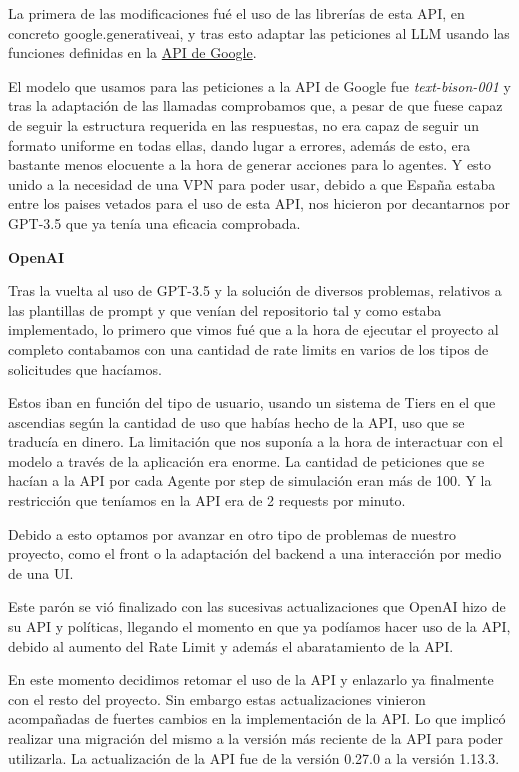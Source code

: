 La primera de las modificaciones fué el uso de las librerías de esta API, en concreto google.generativeai, y tras esto adaptar las peticiones al LLM usando las funciones definidas en la \href{https://ai.google.dev/palm_docs}{API de Google}.

El modelo que usamos para las peticiones a la API de Google fue \textit{text-bison-001} y tras la adaptación de las llamadas comprobamos que, a pesar de que fuese capaz de seguir la estructura requerida en las respuestas, no era capaz de seguir un formato uniforme en todas ellas, dando lugar a errores, además de esto, era bastante menos elocuente a la hora de generar acciones para lo agentes. Y esto unido a la necesidad de una VPN para poder usar, debido a que España estaba entre los paises vetados para el uso de esta API, nos hicieron por decantarnos por GPT-3.5 que ya tenía una eficacia comprobada.

\textbf{OpenAI}

Tras la vuelta al uso de GPT-3.5 y la solución de diversos problemas, relativos a las plantillas de prompt y que venían del repositorio tal y como estaba implementado, lo primero que vimos fué que a la hora de ejecutar el proyecto al completo contabamos con una cantidad de rate limits en varios de los tipos de solicitudes que hacíamos.

Estos iban en función del tipo de usuario, usando un sistema de Tiers en el que ascendias según la cantidad de uso que habías hecho de la API, uso que se traducía en dinero. La limitación que nos suponía a la hora de interactuar con el modelo a través de la aplicación era enorme. La cantidad de peticiones que se hacían a la API por cada Agente por step de simulación eran más de 100. Y la restricción que teníamos en la API era de 2 requests por minuto.

Debido a esto optamos por avanzar en otro tipo de problemas de nuestro proyecto, como el front o la adaptación del backend a una interacción por medio de una UI.

Este parón se vió finalizado con las sucesivas actualizaciones que OpenAI hizo de su API y políticas, llegando el momento en que ya podíamos hacer uso de la API, debido al aumento del Rate Limit y además el abaratamiento de la API.

En este momento decidimos retomar el uso de la API y enlazarlo ya finalmente con el resto del proyecto. Sin embargo estas actualizaciones vinieron acompañadas de fuertes cambios en la implementación de la API. Lo que implicó realizar una migración del mismo a la versión más reciente de la API para poder utilizarla. La actualización de la API fue de la versión 0.27.0 a la versión 1.13.3. 

